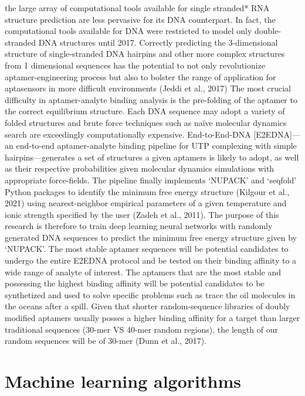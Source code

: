 \documentclass{article}
\begin{document}
the large array of computational tools available for single stranded* 
RNA structure prediction are less pervasive for its DNA counterpart. 
In fact, the computational tools available for DNA were restricted to 
model only double-stranded DNA structures until 2017. Correctly predicting 
the 3-dimensional structure of single-stranded DNA hairpins and other 
more complex structures from 1 dimensional sequences has the potential 
to not only revolutionize aptamer-engineering process but also to bolster
 the range of application for aptasensors in more difficult environments (Jeddi et al., 2017)
 The most crucial difficulty in aptamer-analyte binding analysis is the 
 pre-folding of the aptamer to the correct equilibrium structure. Each DNA
  sequence may adopt a variety of folded structures and brute force 
  techniques such as naïve molecular dynamics search are exceedingly 
  computationally expensive. End-to-End-DNA [E2EDNA]— an end-to-end aptamer-analyte 
  binding pipeline for UTP complexing with simple hairpins—generates a set of 
  structures a given aptamers is likely to adopt, as well as their respective 
  probabilities given molecular dynamics simulations with appropriate force-fields. 
  The pipeline finally implements ‘NUPACK’ and ‘seqfold’ Python packages to identify
   the minimum free energy structure (Kilgour et al., 2021) using nearest-neighbor 
   empirical parameters of a given temperature and ionic strength specified by the
    user (Zadeh et al., 2011). 
The purpose of this research is therefore to train deep learning neural 
networks with randomly generated DNA sequences to predict the minimum 
free energy structure given by ‘NUPACK’.
The most stable aptamer sequences will be potential candidates to 
undergo the entire E2EDNA protocol and be tested on their binding 
affinity to a wide range of analyte of interest. The aptamers that 
are the most stable and possessing the highest binding affinity will 
be potential candidates to be synthetized and used to solve specific 
problems such as trace the oil molecules in the oceans after a spill. 
Given that shorter random-sequence libraries of doubly modified aptamers 
usually posses a higher binding affinity for a target than larger 
traditional sequences (30-mer VS 40-mer random regions), the length 
of our random sequences will be of 30-mer (Dunn et al., 2017). 

\section{Machine learning algorithms}
\end{document}

